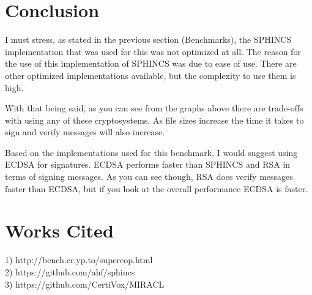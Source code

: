 \documentclass[12pt,a4paper]{article}
\begin{document}
\section*{Conclusion}
I must stress, as stated in the previous section (Benchmarks), the SPHINCS implementation that was used for this was not optimized at all. The reason for the use of this implementation of SPHINCS was due to ease of use. There are other optimized implementations available, but the complexity to use them is high.

With that being said, as you can see from the graphs above there are trade-offs with using any of these cryptosystems. As file sizes increase the time it takes to sign and verify messages will also increase. 

Based on the implementations used for this benchmark, I would suggest using ECDSA for signatures. ECDSA performs faster than SPHINCS and RSA in terms of signing messages. As you can see though, RSA does verify messages faster than ECDSA, but if you look at the overall performance ECDSA is faster.

\section*{Works Cited}
1) http://bench.cr.yp.to/supercop.html \\
2) https://github.com/ahf/sphincs \\
3) https://github.com/CertiVox/MIRACL
\end{document}
